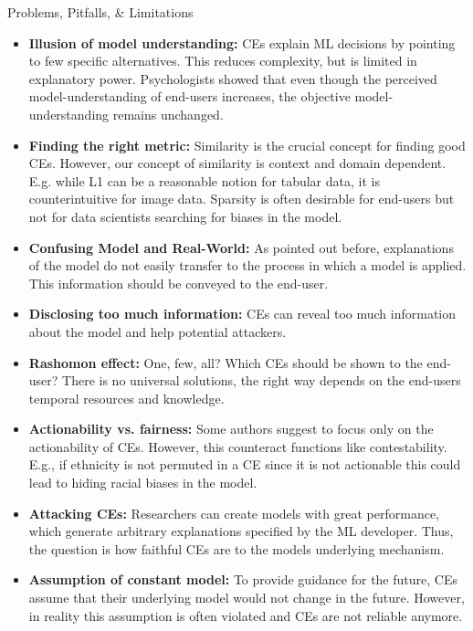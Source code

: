 \documentclass[11pt,compress,t,notes=noshow, xcolor=table]{beamer}
\begin{document}
\begin{vbframe}{Problems, Pitfalls, \& Limitations}
\begin{itemize}
    \item \textbf{Illusion of model understanding:} 
    CEs explain ML decisions by pointing to few specific alternatives. This reduces complexity, but is limited in explanatory power. Psychologists showed that even though the perceived model-understanding of end-users increases, the objective model-understanding remains unchanged.
    
    \item \textbf{Finding the right metric:} Similarity is the crucial concept for finding good CEs. However, our concept of similarity is context and domain dependent. E.g. while L1 can be a reasonable notion for tabular data, it is counterintuitive for image data. Sparsity is often desirable for end-users but not for data scientists searching for biases in the model.
    
    \item \textbf{Confusing Model and Real-World:} As pointed out before, explanations of the model do not easily transfer to the process in which a model is applied. This information should be conveyed to the end-user.
    
    \framebreak
    \item \textbf{Disclosing too much information:} CEs can reveal too much information about the model and help potential attackers.
    \item \textbf{Rashomon effect:} One, few, all? Which CEs should be shown to the end-user? There is no universal solutions, the right way depends on the end-users temporal resources and knowledge. 
    \item \textbf{Actionability vs. fairness:} Some authors suggest to focus only on the actionability of CEs. However, this counteract functions like contestability. E.g., if ethnicity is not permuted in a CE since it is not actionable this could lead to hiding racial biases in the model.
    \item \textbf{Attacking CEs:} Researchers can create models with great performance, which generate arbitrary explanations specified by the ML developer. Thus, the question is how faithful CEs are to the models underlying mechanism.
    \item \textbf{Assumption of constant model:} To provide guidance for the future, CEs assume that their underlying model would not change in the future. However, in reality this assumption is often violated and CEs are not reliable anymore. 
\end{itemize}


\end{vbframe}
\end{document}
